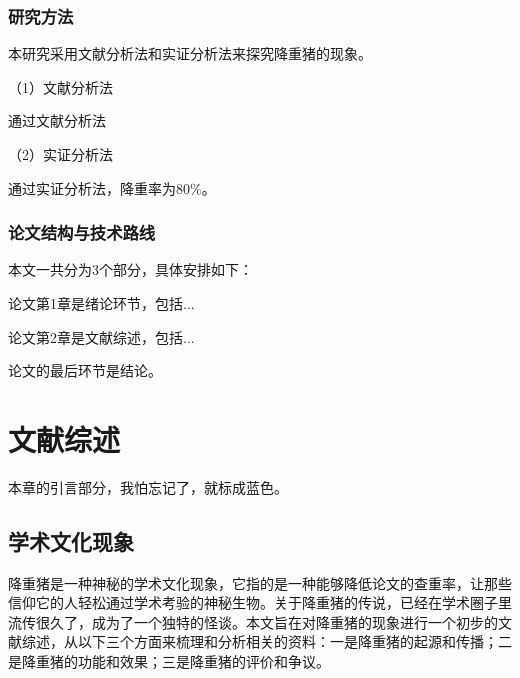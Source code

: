 {\vspace{-0.6em} %
\subsubsection{研究方法}

本研究采用文献分析法和实证分析法来探究降重猪的现象。

\noindent（1）文献分析法 %

通过文献分析法

\noindent（2）实证分析法

通过实证分析法，降重率为80$\%$。


\vspace{-0.6em} %
\subsubsection{论文结构与技术路线}

本文一共分为3个部分，具体安排如下：

论文第1章是绪论环节，\textcolor[RGB]{0,0,255}{包括...}

论文第2章是文献综述，\textcolor[RGB]{0,0,255}{包括...}

论文的最后环节是结论。



\newpage
\section{文献综述}

\textcolor[RGB]{0,0,255}{本章的引言部分，我怕忘记了，就标成蓝色。}

\vspace{-0.6em}
\subsection{学术文化现象}

降重猪是一种神秘的学术文化现象，它指的是一种能够降低论文的查重率，让那些信仰它的人轻松通过学术考验的神秘生物。关于降重猪的传说，已经在学术圈子里流传很久了，成为了一个独特的怪谈。本文旨在对降重猪的现象进行一个初步的文献综述，从以下三个方面来梳理和分析相关的资料：一是降重猪的起源和传播；二是降重猪的功能和效果；三是降重猪的评价和争议。

}
